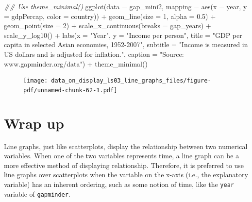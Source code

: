 \documentclass[
  letterpaper,
  DIV=11,
  numbers=noendperiod]{scrreprt}
\newenvironment{Shaded}{\begin{snugshade}}{\end{snugshade}}
\newcommand{\AttributeTok}[1]{\textcolor[rgb]{0.40,0.45,0.13}{#1}}
\newcommand{\DecValTok}[1]{\textcolor[rgb]{0.68,0.00,0.00}{#1}}
\newcommand{\DocumentationTok}[1]{\textcolor[rgb]{0.37,0.37,0.37}{\textit{#1}}}
\newcommand{\FloatTok}[1]{\textcolor[rgb]{0.68,0.00,0.00}{#1}}
\newcommand{\FunctionTok}[1]{\textcolor[rgb]{0.28,0.35,0.67}{#1}}
\newcommand{\NormalTok}[1]{\textcolor[rgb]{0.00,0.23,0.31}{#1}}
\newcommand{\SpecialCharTok}[1]{\textcolor[rgb]{0.37,0.37,0.37}{#1}}
\newcommand{\StringTok}[1]{\textcolor[rgb]{0.13,0.47,0.30}{#1}}
\begin{document}
\begin{Shaded}
\begin{Highlighting}[]
\DocumentationTok{\#\# Use theme\_minimal()}
\FunctionTok{ggplot}\NormalTok{(}\AttributeTok{data =}\NormalTok{ gap\_mini2, }
       \AttributeTok{mapping =} \FunctionTok{aes}\NormalTok{(}\AttributeTok{x =}\NormalTok{ year, }
                     \AttributeTok{y =}\NormalTok{ gdpPercap, }
                     \AttributeTok{color =}\NormalTok{ country)) }\SpecialCharTok{+}
  \FunctionTok{geom\_line}\NormalTok{(}\AttributeTok{size =} \DecValTok{1}\NormalTok{, }\AttributeTok{alpha =} \FloatTok{0.5}\NormalTok{) }\SpecialCharTok{+}
  \FunctionTok{geom\_point}\NormalTok{(}\AttributeTok{size =} \DecValTok{2}\NormalTok{) }\SpecialCharTok{+}
  \FunctionTok{scale\_x\_continuous}\NormalTok{(}\AttributeTok{breaks =}\NormalTok{ gap\_years) }\SpecialCharTok{+}
  \FunctionTok{scale\_y\_log10}\NormalTok{() }\SpecialCharTok{+}
  \FunctionTok{labs}\NormalTok{(}\AttributeTok{x =} \StringTok{"Year"}\NormalTok{, }
       \AttributeTok{y =} \StringTok{"Income per person"}\NormalTok{,}
       \AttributeTok{title =} \StringTok{"GDP per capita in selected Asian economies, 1952{-}2007"}\NormalTok{,}
       \AttributeTok{subtitle =} \StringTok{"Income is measured in US dollars and is adjusted for inflation."}\NormalTok{,}
       \AttributeTok{caption =} \StringTok{"Source: www.gapminder.org/data"}\NormalTok{) }\SpecialCharTok{+}
  \FunctionTok{theme\_minimal}\NormalTok{()}
\end{Highlighting}
\end{Shaded}

\begin{figure}[H]

{\centering \texttt{[image: data\_on\_display\_ls03\_line\_graphs\_files/figure-pdf/unnamed-chunk-62-1.pdf]}

}

\end{figure}

\hypertarget{wrap-up-11}{%
\section{Wrap up}\label{wrap-up-11}}

Line graphs, just like scatterplots, display the relationship between
two numerical variables. When one of the two variables represents time,
a line graph can be a more effective method of displaying relationship.
Therefore, it is preferred to use line graphs over scatterplots when the
variable on the x-axis (i.e., the explanatory variable) has an inherent
ordering, such as some notion of time, like the \texttt{year} variable
of \texttt{gapminder}.
\end{document}

